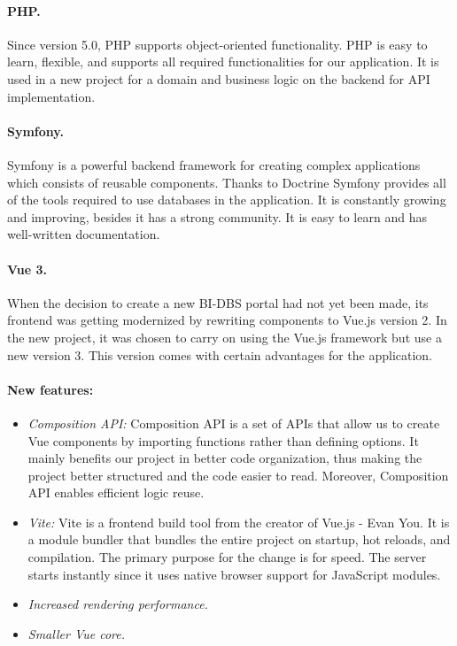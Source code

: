 \paragraph*{PHP.} Since version 5.0, PHP supports object-oriented functionality\cite{php-oop}. PHP is easy to learn, flexible, and supports all required functionalities for our application. It is used in a new project for a domain and business logic on the backend for API implementation.

\paragraph*{Symfony.} Symfony is a powerful backend framework for creating complex applications which consists of reusable components.\cite{symphony-doc} Thanks to Doctrine Symfony provides all of the tools required to use databases in the application. It is constantly growing and improving, besides it has a strong community. It is easy to learn and has well-written documentation.


\paragraph*{Vue 3.} When the decision to create a new BI-DBS portal had not yet been made, its frontend was getting modernized by rewriting components to Vue.js version 2. In the new project, it was chosen to carry on using the Vue.js framework but use a new version 3. This version comes with certain advantages for the application.\cite{vue3-updates}

\paragraph*{New features:}
\begin{itemize}
  \item \emph{Composition API:} Composition API is a set of APIs that allow us to create Vue components by importing functions rather than defining options. It mainly benefits our project in better code organization, thus making the project better structured and the code easier to read. Moreover, Composition API enables efficient logic reuse.\cite{compositionapi-doc}
  
  \item \emph{Vite:} Vite is a frontend build tool from the creator of Vue.js - Evan You. It is a module bundler that bundles the entire project on startup, hot reloads, and compilation. The primary purpose for the change is for speed. The server starts instantly since it uses native browser support for JavaScript modules.\cite{vite-doc}

  \item \emph{Increased rendering performance.}

  \item \emph{Smaller Vue core.}

\end{itemize}

